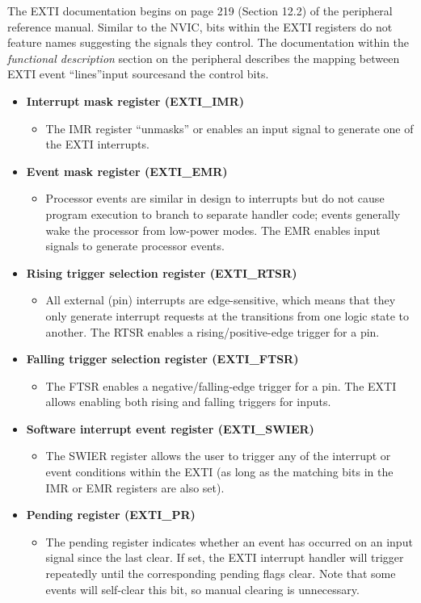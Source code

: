 \documentclass[openany,11pt,fleqn]{book} %
\begin{document}
The EXTI documentation begins on page 219 (Section 12.2) of the peripheral reference manual. Similar to the NVIC, bits within the EXTI registers do not feature names suggesting the signals they control. The documentation within the \textit{functional description} section on the peripheral describes the mapping between EXTI event ``lines''\textemdash input sources\textemdash and the control bits. 


\begin{itemize}
    \item \textbf{Interrupt mask register (EXTI\_IMR)}
    \begin{itemize}
        \item The IMR register ``unmasks'' or enables an input signal to generate one of the EXTI interrupts.
    \end{itemize}
    \item \textbf{Event mask register (EXTI\_EMR)}
    \begin{itemize}
        \item Processor events are similar in design to interrupts but do not cause program execution to branch to separate handler code; events generally wake the processor from low-power modes. The EMR enables input signals to generate processor events. 
    \end{itemize}
    \item \textbf{Rising trigger selection register (EXTI\_RTSR)}
    \begin{itemize}
        \item All external (pin) interrupts are edge-sensitive, which means that they only generate interrupt requests at the transitions from one logic state to another. The RTSR enables a rising/positive-edge trigger for a pin.
    \end{itemize}
    \item \textbf{Falling trigger selection register (EXTI\_FTSR)}
    \begin{itemize}
        \item The FTSR enables a negative/falling-edge trigger for a pin. The EXTI allows enabling both rising and falling triggers for inputs.  
    \end{itemize}
    \item \textbf{Software interrupt event register (EXTI\_SWIER)}
    \begin{itemize}
        \item The SWIER register allows the user to trigger any of the interrupt or event conditions within the EXTI (as long as the matching bits in the IMR or EMR registers are also set). 
    \end{itemize}
    \item \textbf{Pending register (EXTI\_PR)}
    \begin{itemize}
        \item  The pending register indicates whether an event has occurred on an input signal since the last clear. If set, the EXTI interrupt handler will trigger repeatedly until the corresponding pending flags clear. Note that some events will self-clear this bit, so manual clearing is unnecessary. 
    \end{itemize}
\end{itemize}
\end{document}

